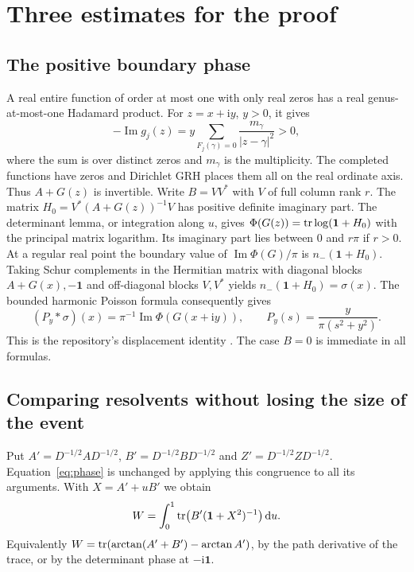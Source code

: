 \documentclass[11pt]{article}
\newcommand{\dd}{\,\mathrm d}\newcommand{\ii}{\mathrm i}
\newcommand{\Imn}{\operatorname{Im}}\newcommand{\Ren}{\operatorname{Re}}
\newcommand{\id}{\mathbf1}\newcommand{\norm}[1]{\left\lVert#1\right\rVert}
\newcommand{\ph}{\Phi}\newcommand{\Gm}{G_0}
\begin{document}
\section{Three estimates for the proof}
\subsection{The positive boundary phase}
A real entire function of order at most one with only real zeros has a real genus-at-most-one Hadamard product. For $z=x+\ii y$, $y>0$, it gives
\[
 -\Imn g_j(z)= y\sum_{F_j(\gamma)=0}\frac{m_\gamma}{|z-\gamma|^2}>0,
\]
where the sum is over distinct zeros and $m_\gamma$ is the multiplicity. The completed functions have zeros and Dirichlet GRH places them all on the real ordinate axis. Thus $A+G(z)$ is invertible. Write $B=VV^*$ with $V$ of full column rank $r$. The matrix $H_0=V^*(A+G(z))^{-1}V$ has positive definite imaginary part. The determinant lemma, or integration along $u$, gives $\ph(G(z))=\tr\log(\id+H_0)$ with the principal matrix logarithm. Its imaginary part lies between $0$ and $r\pi$ if $r>0$. At a regular real point the boundary value of $\Imn\ph(G)/\pi$ is $n_-(\id+H_0)$. Taking Schur complements in the Hermitian matrix with diagonal blocks $A+G(x),-\id$ and off-diagonal blocks $V,V^*$ yields $n_-(\id+H_0)=\sigma(x)$. The bounded harmonic Poisson formula consequently gives
\begin{equation}\label{eq:poisson}
 (P_y*\sigma)(x)=\pi^{-1}\Imn\ph(G(x+\ii y)),\qquad
 P_y(s)=\frac{y}{\pi(s^2+y^2)}.
\end{equation}
This is the repository's displacement identity \cite{repo}. The case $B=0$ is immediate in all formulas.

\subsection{Comparing resolvents without losing the size of the event}
Put $A'=D^{-1/2}AD^{-1/2}$, $B'=D^{-1/2}BD^{-1/2}$ and $Z'=D^{-1/2}ZD^{-1/2}$. Equation~\eqref{eq:phase} is unchanged by applying this congruence to all its arguments. With $X=A'+uB'$ we obtain
\begin{equation}\label{eq:W}
 W=\int_0^1\tr\bigl(B'(\id+X^2)^{-1}\bigr)\dd u.
\end{equation}
Equivalently $W=\operatorname{tr}(\arctan(A'+B')-\arctan A')$, by the path derivative of the trace, or by the determinant phase at $-\ii\id$.
\end{document}
